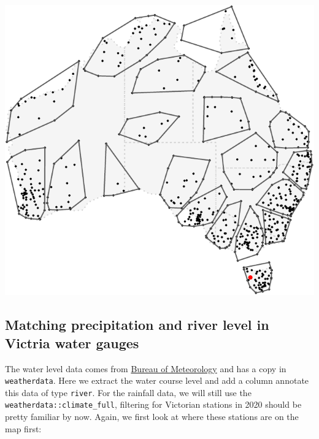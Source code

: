 \documentclass[
]{jss}
\begin{document}
\begin{CodeChunk}


\begin{center}\includegraphics{figures/unnamed-chunk-17-1} \end{center}

\end{CodeChunk}

\hypertarget{matching-precipitation-and-river-level-in-victria-water-gauges}{%
\subsection{Matching precipitation and river level in Victria water
gauges}\label{matching-precipitation-and-river-level-in-victria-water-gauges}}

The water level data comes from
\href{http://www.bom.gov.au/metadata/catalogue/19115/ANZCW0503900528?template=full}{Bureau
of Meteorology} and has a copy in \texttt{weatherdata}. Here we extract
the water course level and add a column annotate this data of type
\texttt{river}. For the rainfall data, we will still use the
\texttt{weatherdata::climate\_full}, filtering for Victorian stations in
2020 should be pretty familiar by now. Again, we first look at where
these stations are on the map first:
\end{document}
